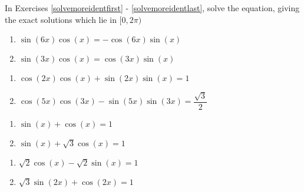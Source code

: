In Exercises \ref{solvemoreidentfirst} - \ref{solvemoreidentlast}, solve the equation, giving the exact solutions which lie in $[0, 2\pi)$

\begin{multicols}{2}

\begin{enumerate}

\setcounter{enumi}{\value{HW}}

\item $\sin(6x) \cos(x) = -\cos(6x) \sin(x)$ \label{solvemoreidentfirst}
\item  $\sin(3x)\cos(x) = \cos(3x) \sin(x)$

\setcounter{HW}{\value{enumi}}

\end{enumerate}

\end{multicols}

\begin{multicols}{2}

\begin{enumerate}

\setcounter{enumi}{\value{HW}}

\item $\cos(2x)\cos(x) + \sin(2x)\sin(x) = 1$ 
\item \small $\cos(5x)\cos(3x) - \sin(5x)\sin(3x) = \dfrac{\sqrt{3}}{2}$ \normalsize

\setcounter{HW}{\value{enumi}}

\end{enumerate}

\end{multicols}

\begin{multicols}{2}

\begin{enumerate}

\setcounter{enumi}{\value{HW}}

\item $\sin(x) + \cos(x) = 1$
\item  $\sin(x) + \sqrt{3} \cos(x) = 1$

\setcounter{HW}{\value{enumi}}

\end{enumerate}

\end{multicols}

\begin{multicols}{2}

\begin{enumerate}

\setcounter{enumi}{\value{HW}}

\item  $\sqrt{2} \cos(x) - \sqrt{2} \sin(x) = 1$
\item  $\sqrt{3} \sin(2x) +  \cos(2x) = 1$

\setcounter{HW}{\value{enumi}}

\end{enumerate}

\end{multicols}

